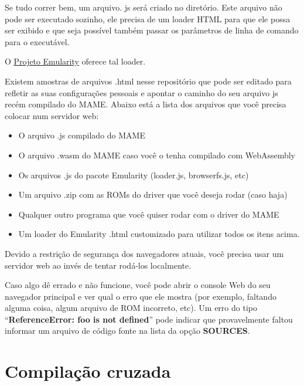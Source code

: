 \documentclass[letterpaper,10pt,brazil]{sphinxmanual}
\begin{document}
Se tudo correr bem, um arquivo. js será criado no diretório. Este
arquivo não pode ser executado sozinho, ele precisa de um loader HTML
para que ele possa ser exibido e que seja possível também passar os
parâmetros de linha de comando para o executável.

O \href{https://github.com/db48x/emularity}{Projeto Emularity} oferece tal
loader.

Existem amostras de arquivos .html nesse repositório que pode ser
editado para refletir as suas configurações pessoais e apontar o caminho
do seu arquivo js recém compilado do MAME. Abaixo está a lista dos
arquivos que você precisa colocar num servidor web:
\begin{itemize}
\item {} 
O arquivo .js compilado do MAME

\item {} 
O arquivo .wasm do MAME caso você o tenha compilado com WebAssembly

\item {} 
Os arquivos .js do pacote Emularity (loader.js, browserfs.js, etc)

\item {} 
Um arquivo .zip com as ROMs do driver que você deseja rodar
(caso haja)

\item {} 
Qualquer outro programa que você quiser rodar com o driver do MAME

\item {} 
Um loader do Emularity .html customizado para utilizar todos os
itens acima.

\end{itemize}

Devido a restrição de segurança dos navegadores atuais, você precisa
usar um servidor web ao invés de tentar rodá-los localmente.

Caso algo dê errado e não funcione, você pode abrir o console Web do seu
navegador principal e ver qual o erro que ele mostra (por exemplo,
faltando alguma coisa, algum arquivo de ROM incorreto, etc).
Um erro do tipo ``\textbf{ReferenceError: foo is not defined}'' pode indicar
que provavelmente faltou informar um arquivo de código fonte na lista da
opção \textbf{SOURCES}.


\section{Compilação cruzada}
\label{initialsetup/crosscompilemame::doc}\label{initialsetup/crosscompilemame:compilacao-cruzada}
\end{document}

